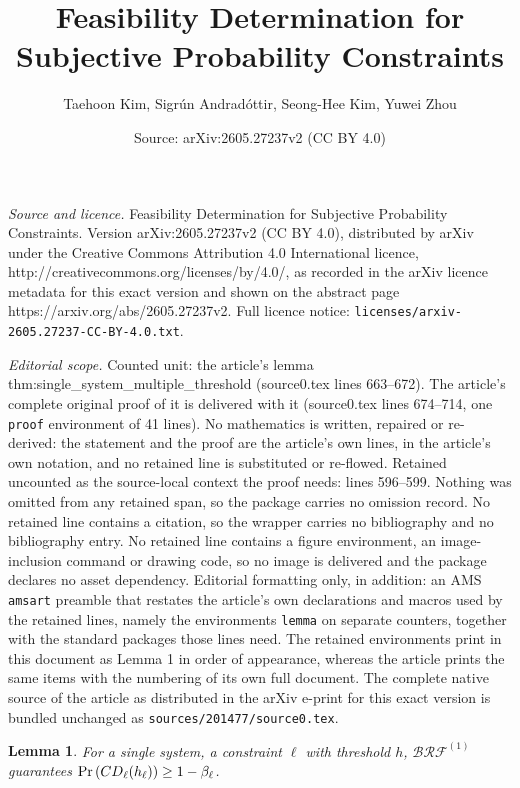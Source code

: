\documentclass[10pt,a4paper]{amsart}
\title{Feasibility Determination for Subjective Probability Constraints}
\author{Taehoon Kim, Sigr\'un Andrad\'ottir, Seong-Hee Kim, Yuwei Zhou}
\date{Source: arXiv:2605.27237v2 (CC BY 4.0)}
\newtheorem{lemma}{Lemma}
\begin{document}
\maketitle

\noindent\emph{Source and licence.} Feasibility Determination for Subjective Probability Constraints. Version arXiv:2605.27237v2 (CC BY 4.0), distributed by arXiv under the Creative Commons Attribution 4.0 International licence, http://creativecommons.org/licenses/by/4.0/, as recorded in the arXiv licence metadata for this exact version and shown on the abstract page https://arxiv.org/abs/2605.27237v2. Full licence notice: \texttt{licenses/arxiv-2605.27237-CC-BY-4.0.txt}.\par\smallskip

\noindent\textit{Editorial scope.} Counted unit: the article's lemma thm:single\_system\_multiple\_threshold (source0.tex lines 663--672). The article's complete original proof of it is delivered with it (source0.tex lines 674--714, one \texttt{proof} environment of 41 lines). No mathematics is written, repaired or re-derived: the statement and the proof are the article's own lines, in the article's own notation, and no retained line is substituted or re-flowed.  Retained uncounted as the source-local context the proof needs: lines 596--599.  Nothing was omitted from any retained span, so the package carries no omission record.  No retained line contains a citation, so the wrapper carries no bibliography and no bibliography entry.  No retained line contains a figure environment, an image-inclusion command or drawing code, so no image is delivered and the package declares no asset dependency.  Editorial formatting only, in addition: an AMS \texttt{amsart} preamble that restates the article's own declarations and macros used by the retained lines, namely the environments \texttt{lemma} on separate counters, together with the standard packages those lines need.  The retained environments print in this document as Lemma 1 in order of appearance, whereas the article prints the same items with the numbering of its own full document.  The complete native source of the article as distributed in the arXiv e-print for this exact version is bundled unchanged as \texttt{sources/201477/source0.tex}.
\begin{lemma} 
\label{thm:single_system_single_threshold}
For a single system, a constraint $\ell$ with threshold $h$, $\mathcal{BRF}^{(1)}$ guarantees $\Pr\left( {\rm CD}_\ell(h_\ell) \right)  \ge 1 - \beta_\ell$.
\end{lemma}
\end{document}
